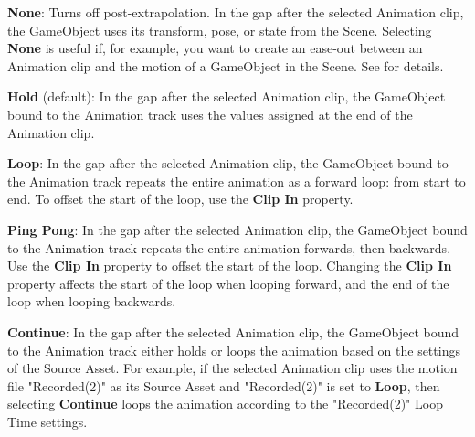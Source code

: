 \begin{DoxyItemize}
\item {\bfseries{None}}\+: Turns off post-\/extrapolation. In the gap after the selected Animation clip, the Game\+Object uses its transform, pose, or state from the Scene. Selecting {\bfseries{None}} is useful if, for example, you want to create an ease-\/out between an Animation clip and the motion of a Game\+Object in the Scene. See  for details.
\item {\bfseries{Hold}} (default)\+: In the gap after the selected Animation clip, the Game\+Object bound to the Animation track uses the values assigned at the end of the Animation clip.
\item {\bfseries{Loop}}\+: In the gap after the selected Animation clip, the Game\+Object bound to the Animation track repeats the entire animation as a forward loop\+: from start to end. To offset the start of the loop, use the {\bfseries{Clip In}} property.
\item {\bfseries{Ping Pong}}\+: In the gap after the selected Animation clip, the Game\+Object bound to the Animation track repeats the entire animation forwards, then backwards. Use the {\bfseries{Clip In}} property to offset the start of the loop. Changing the {\bfseries{Clip In}} property affects the start of the loop when looping forward, and the end of the loop when looping backwards.
\item {\bfseries{Continue}}\+: In the gap after the selected Animation clip, the Game\+Object bound to the Animation track either holds or loops the animation based on the settings of the Source Asset. For example, if the selected Animation clip uses the motion file "{}\+Recorded(2)"{} as its Source Asset and "{}\+Recorded(2)"{} is set to {\bfseries{Loop}}, then selecting {\bfseries{Continue}} loops the animation according to the "{}\+Recorded(2)"{} Loop Time settings. 
\end{DoxyItemize}